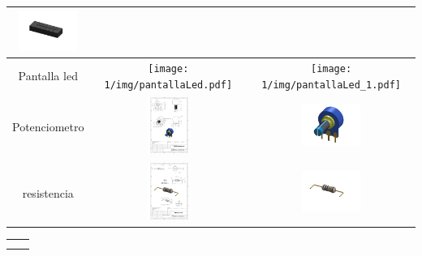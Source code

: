 \begin{itemize}
\begin{table} [H]
\begin{tabular}   {| c |  c |  c | }
       \includegraphics[width=19mm]{1/img/multicontacto_1.pdf} \\
        \hline
        Pantalla led & \texttt{[image: 1/img/pantallaLed.pdf]}  & 
       \texttt{[image: 1/img/pantallaLed\_1.pdf]} \\
        \hline
       Potenciometro & \includegraphics[height=19mm]{1/img/potenciometro.pdf}  & 
       \includegraphics[width=19mm]{1/img/potenciometro_1.pdf} \\
        \hline
       
        resistencia & \includegraphics[height=19mm]{1/img/resistencia.pdf}  & 
       \includegraphics[width=19mm]{1/img/resistencia_1.pdf} \\
        \hline 
       
        
        \end{tabular} 
       
         \label {tab : my_label}  \label {}
          \end{table} 
    
      \begin{tabular}{c|c}
           &  \\
           & 
      \end{tabular}
    
    \end{itemize}
